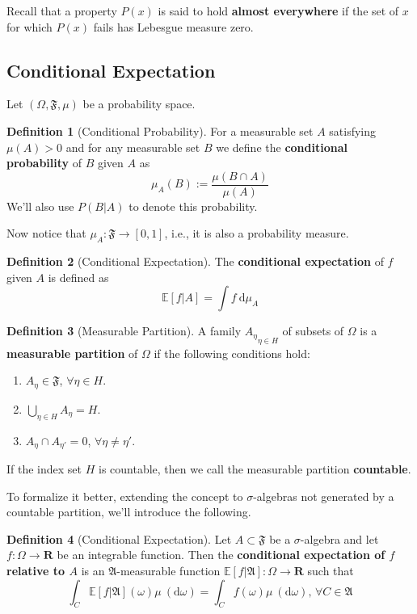 \documentclass[12pt,a4paper]{article}
\theoremstyle{definition}
\newtheorem{definition}{Definition}[section]
\begin{document}
Recall that a property $P(x)$ is said to hold \textbf{almost everywhere} if the set of $x$ for which $P(x)$ fails has Lebesgue measure zero.

\subsection{Conditional Expectation}

Let $(\Omega, \mathfrak{F}, \mu)$ be a probability space.

\begin{definition}[Conditional Probability]
For a measurable set $A$ satisfying $\mu(A) > 0$ and for any measurable set $B$ we define the \textbf{conditional probability} of $B$ given $A$ as
\[
	\mu_A(B) := \frac{\mu(B \cap A)}{\mu(A)} 
\]
We'll also use $P(B | A)$ to denote this probability.
\end{definition}

Now notice that $\mu_A : \mathfrak{F} \longrightarrow [0,1]$, i.e., it is also a probability measure.

\begin{definition}[Conditional Expectation]
	The \textbf{conditional expectation} of $f$ given $A$ is defined as 
\[
	\mathbb{E} [f | A] = \int f ~\mathrm{d}\mu_A
\]
\end{definition}

\begin{definition}[Measurable Partition]
	A family ${A_\eta}_{\eta \in H}$ of subsets of $\Omega$ is a \textbf{measurable partition} of $\Omega$ if the following conditions hold:
	\begin{enumerate}
		\item $A_\eta \in \mathfrak{F}$, $\forall \eta \in H$.
		\item $\bigcup_{\eta \in H} A_\eta = H$.
		\item $A_\eta \cap A_{\eta'} = 0$, $\forall \eta \neq \eta'$.
	\end{enumerate}
	If the index set $H$ is countable, then we call the measurable partition \textbf{countable}.
\end{definition}

To formalize it better, extending the concept to $\sigma$-algebras not generated by a countable partition, we'll introduce the following.

\begin{definition}[Conditional Expectation]
	Let $A \subset \mathfrak{F}$ be a $\sigma$-algebra and let $f : \Omega \longrightarrow \textbf{R}$ be an integrable function. Then the \textbf{conditional expectation of $f$ relative to $A$} is an $\mathfrak{A}$-measurable function $\mathbb{E}[f | \mathfrak{A}] : \Omega \longrightarrow \textbf{R}$ such that
	\[
		\int_C \mathbb{E}[f | \mathfrak{A}](\omega) \mu ~(\mathrm{d} \omega) = \int_C f(\omega) \mu ~(\mathrm{d} \omega), \, \forall C \in \mathfrak{A}
	\]
\end{definition}
\end{document}
